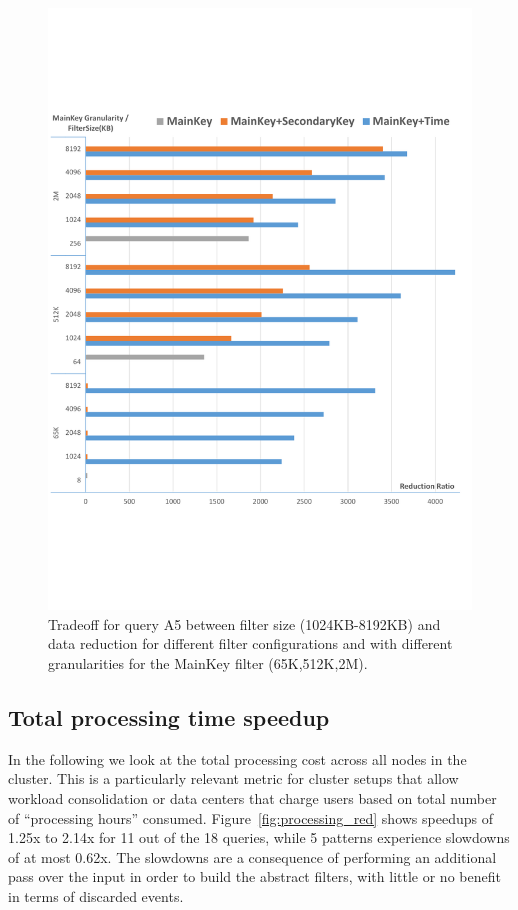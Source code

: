 \begin{figure}[tp]
	\centering
	
	\includegraphics[clip, trim=0cm 3.5cm 0.3cm 3.7cm,
	width=\columnwidth]{graphs/A5_tradeoff.pdf}
	\caption{Tradeoff for query A5 between filter size (1024KB-8192KB) and data
		reduction for different filter configurations and with different 
		granularities
		for the MainKey filter (65K,512K,2M).}
	\label{fig:tradeoff}
\end{figure}

\subsection{Total processing time speedup}

In the following we look at the total processing cost across all nodes in the
cluster.
This is a particularly relevant metric for cluster setups that allow workload
consolidation or data centers that charge users based on total number of
``processing hours'' consumed.
Figure~\ref{fig:processing_red} shows speedups of 1.25x to 2.14x for 11 out of
the 18 queries, while 5 patterns experience slowdowns of at most 0.62x.
The slowdowns are a consequence of performing an additional pass over the input
in order to build the abstract filters, with little or no benefit in terms of
discarded events.

